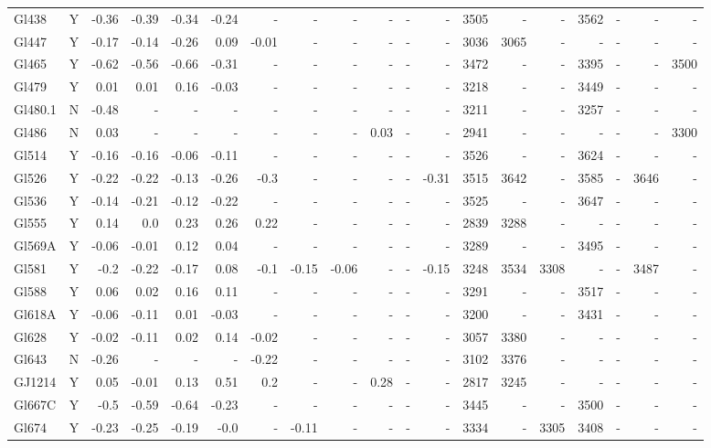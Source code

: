 \documentclass{aa}
\begin{document}
{\begin{landscape}
{\begin{longtable}{l c r r r r r r r r r r | r r r r r r r }
Gl438 & Y & -0.36 & -0.39 & -0.34 & -0.24 & - & - & - & - & - & - & 3505 & - & - & 3562 & - & - & - \\
Gl447 & Y & -0.17 & -0.14 & -0.26 & 0.09 & -0.01 & - & - & - & - & - & 3036 & 3065 & - & - & - & - & - \\
Gl465 & Y & -0.62 & -0.56 & -0.66 & -0.31 & - & - & - & - & - & - & 3472 & - & - & 3395 & - & - & 3500 \\
Gl479 & Y & 0.01 & 0.01 & 0.16 & -0.03 & - & - & - & - & - & - & 3218 & - & - & 3449 & - & - & - \\
Gl480.1 & N & -0.48 & - & - & - & - & - & - & - & - & - & 3211 & - & - & 3257 & - & - & - \\
Gl486 & N & 0.03 & - & - & - & - & - & - & 0.03 & - & - & 2941 & - & - & - & - & - & 3300 \\
Gl514 & Y & -0.16 & -0.16 & -0.06 & -0.11 & - & - & - & - & - & - & 3526 & - & - & 3624 & - & - & - \\
Gl526 & Y & -0.22 & -0.22 & -0.13 & -0.26 & -0.3 & - & - & - & - & -0.31 & 3515 & 3642 & - & 3585 & - & 3646 & - \\
Gl536 & Y & -0.14 & -0.21 & -0.12 & -0.22 & - & - & - & - & - & - & 3525 & - & - & 3647 & - & - & - \\
Gl555 & Y & 0.14 & 0.0 & 0.23 & 0.26 & 0.22 & - & - & - & - & - & 2839 & 3288 & - & - & - & - & - \\
Gl569A & Y & -0.06 & -0.01 & 0.12 & 0.04 & - & - & - & - & - & - & 3289 & - & - & 3495 & - & - & - \\
Gl581 & Y & -0.2 & -0.22 & -0.17 & 0.08 & -0.1 & -0.15 & -0.06 & - & - & -0.15 & 3248 & 3534 & 3308 & - & - & 3487 & - \\
Gl588 & Y & 0.06 & 0.02 & 0.16 & 0.11 & - & - & - & - & - & - & 3291 & - & - & 3517 & - & - & - \\
Gl618A & Y & -0.06 & -0.11 & 0.01 & -0.03 & - & - & - & - & - & - & 3200 & - & - & 3431 & - & - & - \\
Gl628 & Y & -0.02 & -0.11 & 0.02 & 0.14 & -0.02 & - & - & - & - & - & 3057 & 3380 & - & - & - & - & - \\
Gl643 & N & -0.26 & - & - & - & -0.22 & - & - & - & - & - & 3102 & 3376 & - & - & - & - & - \\
GJ1214 & Y & 0.05 & -0.01 & 0.13 & 0.51 & 0.2 & - & - & 0.28 & - & - & 2817 & 3245 & - & - & - & - & - \\
Gl667C & Y & -0.5 & -0.59 & -0.64 & -0.23 & - & - & - & - & - & - & 3445 & - & - & 3500 & - & - & - \\
Gl674 & Y & -0.23 & -0.25 & -0.19 & -0.0 & - & -0.11 & - & - & - & - & 3334 & - & 3305 & 3408 & - & - & - \\

\end{longtable}}
\end{landscape}}
\end{document}

